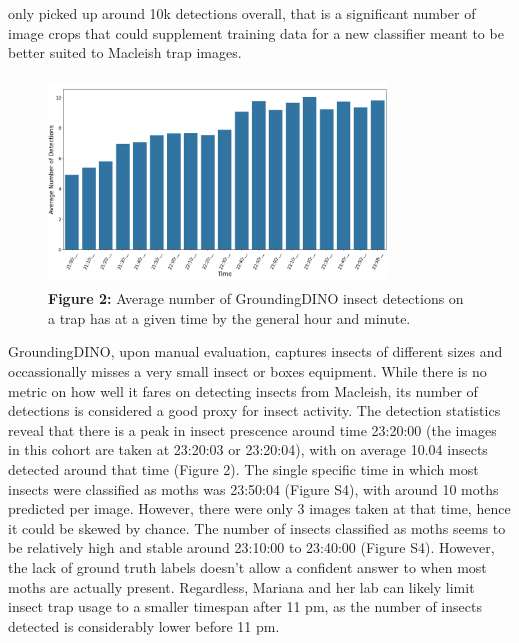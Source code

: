 \documentclass[twocolumn]{article}
\newcommand\tab[1][1cm]{\hspace*{#1}}
\begin{document}
     only picked up around 10k detections overall, that is a significant number of image crops that could supplement training data
        for a new classifier meant to be better suited to Macleish trap images.
    \newline
    \begin{figure}[h]
        \begin{varwidth}{0.5\textwidth}
            \includegraphics[width=9cm, height=5.5cm]{imgs/detections_final.png}
            \captionsetup{width=0.9\textwidth}
            \caption*{\textbf{Figure 2:} Average number of GroundingDINO insect detections on a trap has at a given time 
            by the general hour and minute.} 
        \end{varwidth}
    \end{figure}

    \tab GroundingDINO, upon manual evaluation, captures insects 
    of different sizes and occassionally misses a very small insect or boxes equipment. While there is no metric on how well
    it fares on detecting insects from Macleish, its number of detections is considered a good proxy for insect activity.
    The detection statistics reveal that there is a peak in insect prescence around time 
    23:20:00 (the images in this cohort are taken at 23:20:03 or 23:20:04), with on average 10.04 insects detected around that time
    (Figure 2). The single specific time in which most insects were classified as moths was 23:50:04 (Figure S4), with around 10 moths predicted per image. 
    However, there were only 3 images
    taken at that time, hence it could be skewed by chance. The number of insects classified as moths seems to be 
    relatively high and stable around 23:10:00 to 23:40:00 (Figure S4). However, the lack of ground truth labels doesn't allow a confident
    answer to when most moths are actually present. Regardless, Mariana and her lab can likely limit insect trap usage to a smaller
    timespan after 11 pm, as the number of insects detected is considerably lower before 11 pm.
\end{document}
